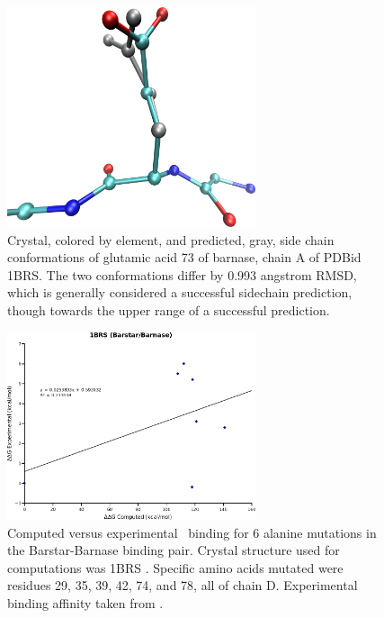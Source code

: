 \begin{figure}[h]
  \centering
  \includegraphics[width=0.65\textwidth,height=0.3\textheight,keepaspectratio]{figures/mutation_side_chain_images/1brs_chain_a_73.png}
  \caption{Crystal, colored by element, and predicted, gray, side chain conformations of glutamic acid 73 of barnase, chain A of PDBid 1BRS.
The two conformations differ by 0.993 angstrom RMSD, which is generally considered a successful sidechain prediction, though towards the upper range of a successful prediction.}
  \label{figure:computational_mutation_scanning/figname}
\end{figure}
\clearpage




\begin{figure}[h]
  \centering
  \includegraphics[width=0.65\textwidth]{figures/1brs_barstar_barnase.png}
  \caption{
Computed versus experimental \ddg\ binding for 6 alanine mutations in the Barstar-Barnase binding pair.
Crystal structure used for computations was 1BRS \protect\cite{buckle1994protein}.
Specific amino acids mutated were residues 29, 35, 39, 42, 74, and 78, all of chain D.
Experimental binding affinity taken from \protect\cite{thorn2001asedb}.
            }
\end{figure}

